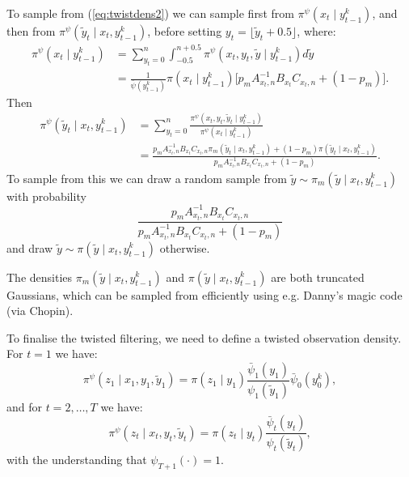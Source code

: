 \documentclass[a4paper]{article}
\begin{document}
To sample from (\ref{eq:twistdens2}) we can sample first from $\pi^{\psi}\left(x_t \mid y^k_{t - 1}\right)$, and then from $\pi^\psi\left(\tilde{y}_t \mid x_t, y^k_{t - 1}\right)$, before setting $y_t = \lfloor \tilde{y}_t + 0.5 \rfloor$, where:
\begin{align}
    \pi^{\psi}\left(x_t \mid y^k_{t - 1}\right) &= \sum_{y_t = 0}^n \int_{-0.5}^{n + 0.5} \pi^{\psi}\left(x_t, y_t, \tilde{y} \mid y^k_{t - 1}\right) d\tilde{y}\nonumber \\
    & = \frac{1}{\bar{\psi}\left(y^k_{t - 1}\right)}\pi\left(x_t \mid y^k_{t - 1}\right)\Big[ p_m A^{-1}_{x_t, n}B_{x_t} C_{x_t, n} + \left(1 - p_m\right)\Big].
\end{align}
Then
\begin{align}
    \pi^{\psi}\left(\tilde{y}_t \mid x_t, y^k_{t - 1}\right) &= \sum_{y_t = 0}^n\frac{\pi^{\psi}\left(x_t, y_t, \tilde{y}_t \mid y^k_{t - 1}\right)}{\pi^{\psi}\left(x_t \mid y^k_{t - 1}\right)}\nonumber\\
     &=  \frac{p_m A^{-1}_{x_t, n}B_{x_t}C_{x_t, n} \pi_m\left(\tilde{y}_t \mid x_t, y^k_{t - 1}\right) + \left(1 - p_m\right) \pi\left(\tilde{y}_t \mid x_t, y^k_{t - 1}\right)}{p_m A^{-1}_{x_t, n}B_{x_t}C_{x_t, n} + \left(1 - p_m\right)}\label{eq:twisty}.
\end{align}
To sample from this we can draw  a random sample from $\tilde{y} \sim \pi_m\left(\tilde{y} \mid x_t, y^k_{t - 1}\right)$ with probability
\begin{equation*}
    \frac{p_m A^{-1}_{x_t, n}B_{x_t}C_{x_t, n}}{p_m A^{-1}_{x_t, n}B_{x_t}C_{x_t, n} + \left(1 - p_m\right)}
\end{equation*}
and draw $\tilde{y} \sim \pi\left(\tilde{y} \mid x_t, y^k_{t - 1}\right)$ otherwise. 

The densities $\pi_m\left(\tilde{y} \mid x_t, y^k_{t - 1}\right)$ and $\pi\left(\tilde{y} \mid x_t, y^k_{t - 1}\right)$ are both truncated Gaussians, which can be sampled from efficiently using e.g. Danny's magic code (via Chopin).

To finalise the twisted filtering, we need to define a twisted observation density. For $t = 1$ we have:
\begin{equation}
    \pi^{\psi}\left(z_1 \mid x_1, y_1, \tilde{y}_1\right) = \pi\left(z_1 \mid y_1\right)\frac{\bar{\psi}_1\left(y_1\right)}{\psi_1\left(\tilde{y}_1\right)}\bar{\psi}_0\left(y^k_0\right),
\end{equation}
and for $t = 2, \dots, T$ we have:
\begin{equation}
    \pi^{\psi}\left(z_t \mid x_t, y_t, \tilde{y}_t\right) = \pi\left(z_t \mid y_t\right)\frac{\bar{\psi}_t\left(y_t\right)}{\psi_t\left(\tilde{y}_t\right)},
\end{equation}
with the understanding that $\psi_{T + 1}\left(\cdot\right) = 1$.
\end{document}
